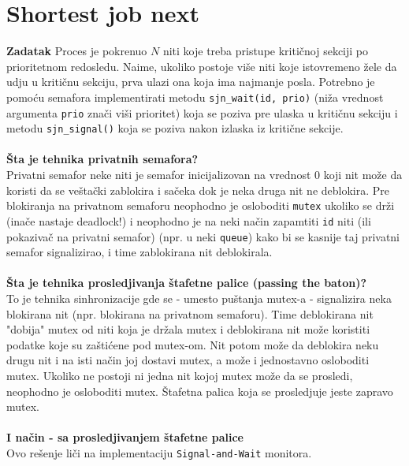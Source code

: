 \clearpage
\section{Shortest job next}
\textbf{\large Zadatak} Proces je pokrenuo $N$ niti koje treba pristupe kriti\v{c}noj sekciji po prioritetnom redosledu. Naime, ukoliko postoje vi\v{s}e niti koje istovremeno \v{z}ele da udju u kriti\v{c}nu sekciju, prva ulazi ona koja ima najmanje posla. Potrebno je pomo\'{c}u semafora implementirati metodu \texttt{sjn\_wait(id, prio)} (ni\v{z}a vrednost argumenta \texttt{prio} zna\v{c}i vi\v{s}i prioritet) koja se poziva pre ulaska u kriti\v{c}nu sekciju i metodu \texttt{sjn\_signal()} koja se poziva nakon izlaska iz kriti\v{c}ne sekcije.
\\\\
\textbf{\v{S}ta je tehnika privatnih semafora?}\\
Privatni semafor neke niti je semafor inicijalizovan na vrednost 0 koji nit mo\v{z}e da koristi da se ve\v{s}ta\v{c}ki zablokira i sa\v{c}eka dok je neka druga nit ne deblokira. Pre blokiranja na privatnom semaforu neophodno je osloboditi \texttt{mutex} ukoliko se dr\v{z}i (ina\v{c}e nastaje deadlock!) i neophodno je na neki na\v{c}in zapamtiti \texttt{id} niti (ili pokaziva\v{c} na privatni semafor) (npr. u neki \texttt{queue}) kako bi se kasnije taj privatni semafor signalizirao, i time zablokirana nit deblokirala.\\\\
\textbf{\v{S}ta je tehnika prosledjivanja \v{s}tafetne palice (passing the baton)?}\\
To je tehnika sinhronizacije gde se - umesto pu\v{s}tanja mutex-a - signalizira neka blokirana nit (npr. blokirana na privatnom semaforu). Time deblokirana nit "dobija" mutex od niti koja je dr\v{z}ala mutex i deblokirana nit mo\v{z}e koristiti podatke koje su za\v{s}ti\'{c}ene pod mutex-om. Nit potom mo\v{z}e da deblokira neku drugu nit i na isti na\v{c}in joj dostavi mutex, a mo\v{z}e i jednostavno osloboditi mutex. Ukoliko ne postoji ni jedna nit kojoj mutex mo\v{z}e da se prosledi, neophodno je osloboditi mutex. \v{S}tafetna palica koja se prosledjuje jeste zapravo mutex. 
\\\\
\textbf{\large I na\v{c}in - sa prosledjivanjem \v{s}tafetne palice}\\
Ovo re\v{s}enje li\v{c}i na implementaciju \texttt{Signal-and-Wait} monitora.
